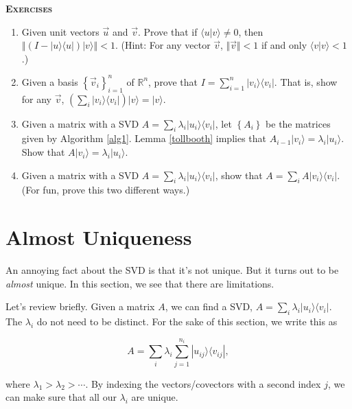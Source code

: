 \documentclass{amsbook}
\begin{document}
{\bfseries\scshape\Large Exercises}

\begin{enumerate}
\item \label{finish_projection} Given unit vectors $\vec u$ and $\vec v$.  Prove that if $\langle u|v\rangle\neq0$, then $\left\Vert\left(I-|u\rangle\langle u|\right)|v\rangle\right\Vert < 1$.  (Hint:  For any vector $\vec v $, $\Vert \vec v \Vert<1$ if and only $\langle  v | v \rangle<1$.)
\item \label{outer_product_identity} Given a basis $\left\{\vec v_i\right\}_{i=1}^n$ of $\mathbb R^n$, prove that $I=\sum_{i=1}^n|v_i\rangle\langle v_i|$.  That is, show for any $\vec v$, $\left(\sum_i|v_i\rangle\langle v_i|\right)|v\rangle=|v\rangle$.
\item Given a matrix with a SVD $A=\sum_i\lambda_i|u_i\rangle\langle v_i|$, let $\left\{A_i\right\}$ be the matrices given by Algorithm \ref{alg1}.  Lemma \ref{tollbooth} implies that $A_{i-1}|v_i\rangle=\lambda_i|u_i\rangle$.  Show that $A|v_i\rangle=\lambda_i|u_i\rangle$.
\item Given a matrix with a SVD $A=\sum_i\lambda_i|u_i\rangle\langle v_i|$, show that $A=\sum_iA|v_i\rangle\langle v_i|$.  (For fun, prove this two different ways.)
\end{enumerate}

\section{Almost Uniqueness}\label{almost_uniqueness}

An annoying fact about the SVD is that it's not unique.  But it turns out to be {\em almost} unique.  In this section, we see that there are limitations.

Let's review briefly.  Given a matrix $A$, we can find a SVD, $A=\sum_i\lambda_i|u_i\rangle\langle v_i|$.  The $\lambda_i$ do not need to be distinct.  For the sake of this section, we write this as 

\begin{equation}
\label{multilambda}
A=\sum_i\lambda_i\sum_{j=1}^{n_i}|u_{ij}\rangle\langle v_{ij}|,
\end{equation}

 where $\lambda_1>\lambda_2>\cdots$.  By indexing the vectors/covectors with a second index $j$, we can make sure that all our $\lambda_i$ are unique.
 
\end{document}

